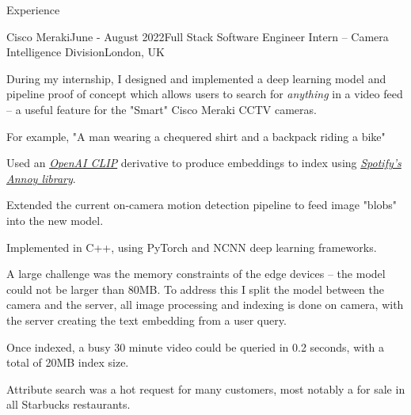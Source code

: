 \documentclass{structure}
\begin{document}
\begin{rSection}{Experience}

    \begin{rSubsection}{Cisco Meraki}{June - August 2022}{Full Stack Software Engineer Intern -- Camera Intelligence Division}{London, UK}{}
        \item During my internship, I designed and implemented a deep learning model and pipeline proof of concept which allows users
        to search for \emph{anything} in a video feed -- a useful feature for the "Smart" Cisco Meraki CCTV cameras.
        \item For example, "A man wearing a chequered shirt and a backpack riding a bike"
        \item Used an \emph{\href{https://openai.com/blog/clip/}{OpenAI CLIP}} derivative to produce embeddings
        to index using \emph{\href{https://github.com/spotify/annoy}{Spotify's Annoy library}}.
        \item Extended the current on-camera motion detection pipeline to feed image "blobs" into the new model.
        \item Implemented in C++, using PyTorch and NCNN deep learning frameworks.
        \item A large challenge was the memory constraints of the edge devices -- the model could not be larger than 80MB.
        To address this I split the model between the camera and the server,
        all image processing and indexing is done on camera, with the server creating the text embedding from a user query.
        \item Once indexed, a busy 30 minute video could be queried in 0.2 seconds, with a total of 20MB index size.
        \item Attribute search was a hot request for many customers, most notably a for sale in all Starbucks restaurants.
        \item \href{https://gist.githubusercontent.com/tom-pollak/1a2e8c1fc61ba269e25c73c02c78007c/raw/45c8cbceda8cd745d6d00cb16a09979778df663b/gistfile1.txt}{\color{blue}{Project Reference}}
    \end{rSubsection}

\end{rSection}

\end{document}
